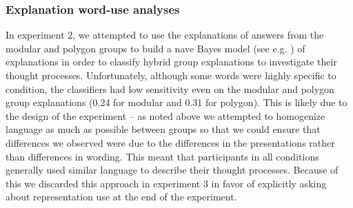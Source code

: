 \documentclass[man,10pt]{apa6}
\begin{document}
\subsubsection{Explanation word-use analyses}
In experiment 2, we attempted to use the explanations of answers from the modular and polygon groups to build a nave Bayes model (see e.g. \cite{Ng2002}) of explanations in order to classify hybrid group explanations to investigate their thought processes. Unfortunately, although some words were highly specific to condition, the classifiers had low sensitivity even on the modular and polygon group explanations (0.24 for modular and 0.31 for polygon). This is likely due to the design of the experiment -- as noted above we attempted to homogenize language as much as possible between groups so that we could ensure that differences we observed were due to the differences in the presentations rather than differences in wording. This meant that participants in all conditions generally used similar language to describe their thought processes. Because of this we discarded this approach in experiment 3 in favor of explicitly asking about representation use at the end of the experiment. 
\end{document}
